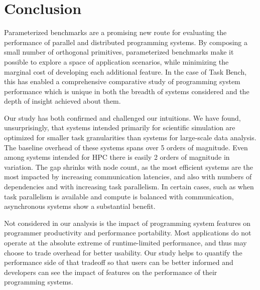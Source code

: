 \section{Conclusion}
\label{sec:conclusion}

Parameterized benchmarks are a promising new route for evaluating the
performance of parallel and distributed programming systems. By
composing a small number of orthogonal primitives, parameterized
benchmarks make it possible to explore a space of application
scenarios, while minimizing the marginal cost of developing each
additional feature. In the case of Task Bench, this has enabled a
comprehensive comparative study of programming system performance
which is unique in both the breadth of systems considered and the
depth of insight achieved about them.

Our study has both confirmed and challenged our intuitions. We have
found, unsurprisingly, that systems intended primarily for scientific
simulation are optimized for smaller task granularities than systems
for large-scale data analysis. The baseline overhead of these systems
spans over 5 orders of magnitude. Even among systems intended for HPC
there is easily 2 orders of magnitude in variation. The gap shrinks
with node count, as the most efficient systems are the most impacted
by increasing communication latencies, and also with numbers of
dependencies and with increasing task parallelism. In certain cases,
such as when task parallelism is available and compute is balanced
with communication, asynchronous systems show a substantial benefit.

Not considered in our analysis is the impact of programming system
features on programmer productivity and performance portability. Most
applications do not operate at the absolute extreme of runtime-limited
performance, and thus may choose to trade overhead for better
usability. Our study helps to quantify the performance side of that tradeoff so that users can be better informed and developers can
see the impact of features on the performance of their programming
systems.
